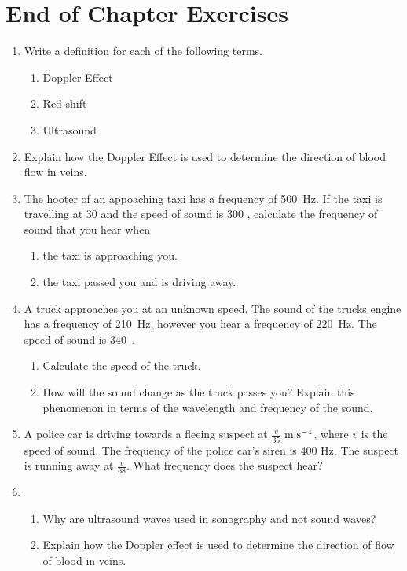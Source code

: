 \section{End of Chapter Exercises}
\begin{enumerate}
\item{Write a definition for each of the following terms.
\begin{enumerate}
\item Doppler Effect
\item Red-shift
\item Ultrasound
\end{enumerate}}
\item{Explain how the Doppler Effect is used to determine the direction of blood flow in veins.}
\item{The hooter of an appoaching taxi has a frequency of 500~Hz. If the taxi is travelling at 30 \ms and the speed of sound is 300 \ms, calculate the frequency of sound that you hear when 
\begin{enumerate}
\item the taxi is approaching you.
\item the taxi passed you and is driving away.
\end{enumerate}}
\item{A truck approaches you at an unknown speed. The sound of the trucks engine has a frequency of 210~Hz, however you hear a frequency of 220~Hz. The speed of sound is 340~\ms.
\begin{enumerate}
\item Calculate the speed of the truck.
\item How will the sound change as the truck passes you? Explain this phenomenon in terms of the wavelength and frequency of the sound.
\end{enumerate}}
\item{A police car is driving towards a fleeing suspect at $\frac{v}{35}$ m.$\rm{s^{-1}}$, where $v$ is the speed of sound. The frequency of the police car's siren is 400 Hz. The suspect is running away at $\frac{v}{68}$. What frequency does the suspect hear?}
\item{\begin{enumerate}
\item Why are ultrasound waves used in sonography and not sound waves?
\item Explain how the Doppler effect is used to determine the direction of flow of blood in veins.
\end{enumerate}}

\end{enumerate}



